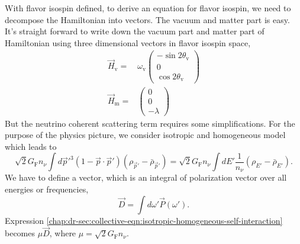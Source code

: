 










With flavor isospin defined, to derive an equation for flavor isospin, we need to decompose the Hamiltonian into vectors. The vacuum and matter part is easy. It's straight forward to write down the vacuum part and matter part of Hamiltonian using three dimensional vectors in flavor isospin space,
\begin{align*}
   \vec H_{\mathrm v} = & \omega_{\mathrm v}\begin{pmatrix}
   -\sin 2\theta_{\mathrm v}\\
   0\\
   \cos 2\theta_{\mathrm v}
   \end{pmatrix}\\
   \vec H_{\mathrm m} = & \begin{pmatrix}
   0\\
   0\\
   -\lambda
   \end{pmatrix}
\end{align*}
But the neutrino coherent scattering term requires some simplifications. For the purpose of the physics picture, we consider isotropic and homogeneous model which leads to
\begin{equation}
   \sqrt{2}G_{\mathrm F} n_\nu \int d\vec p'^3 (1-\vec p \cdot \vec p') (\rho_{\vec p'} - \bar\rho_{\vec p'}) = \sqrt{2}G_{\mathrm F} n_\nu \int dE' \frac{1}{n_\nu}(\rho_{E'} - \bar\rho_{E'}).
   \label{chap:dr-sec:collective-eqn:isotropic-homogeneous-self-interaction}
\end{equation}
We have to define a vector, which is an integral of polarization vector over all energies or frequencies,
\begin{equation}
   \vec D = \int d\omega' \vec P(\omega').
\end{equation}
Expression \ref{chap:dr-sec:collective-eqn:isotropic-homogeneous-self-interaction} becomes $\mu \vec D$, where $\mu = \sqrt{2}G_{\mathrm F} n_\nu$.

